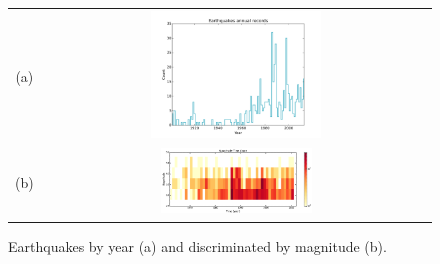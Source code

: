 \documentclass[draft, grl]{agutex}
\begin{document}
\begin{figure}
	\begin{center}
	\begin{table}[H]
		\begin{tabular}{ c c }
		\footnotesize(a)
		& \includegraphics[width=0.45\textwidth]{z_img_hmtk_bsb2014_11_rate}
		\\
		\footnotesize(b)
		& \includegraphics[width=0.40\textwidth]{z_img_time_mag_count_br_1960}
		\end{tabular}
	\end{table}
	\caption{Earthquakes by year (a) and discriminated by magnitude (b).}
	\label{fig_records}
	\end{center}
\end{figure}
\end{document}
